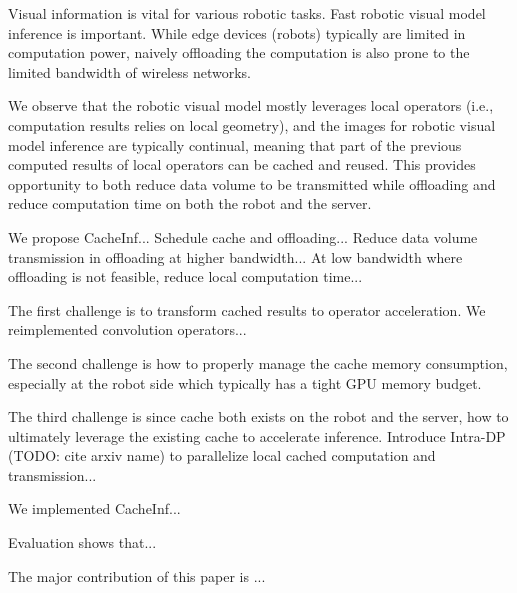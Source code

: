 Visual information is vital for various robotic tasks. Fast robotic visual model inference is important. While edge devices (robots) typically are limited in computation power, 
naively offloading the computation is also prone to the limited bandwidth of wireless networks.

We observe that the robotic visual model mostly leverages local operators (i.e., computation results relies on local geometry), and the images for robotic visual model inference are typically continual, meaning that part of the previous computed results of local operators can be cached and reused.
This provides opportunity to both reduce data volume to be transmitted while offloading and reduce computation time on both the robot and the server.

We propose CacheInf...
Schedule cache and offloading...
Reduce data volume transmission in offloading at higher bandwidth...
At low bandwidth where offloading is not feasible, reduce local computation time...

The first challenge is to transform cached results to operator acceleration. We reimplemented convolution operators...

The second challenge is how to properly manage the cache memory consumption, especially at the robot side which typically has a tight GPU memory budget.

The third challenge is since cache both exists on the robot and the server, how to ultimately leverage the existing cache to accelerate inference.
Introduce Intra-DP (TODO: cite arxiv name) to parallelize local cached computation and transmission...

We implemented CacheInf...

Evaluation shows that...

The major contribution of this paper is ...

